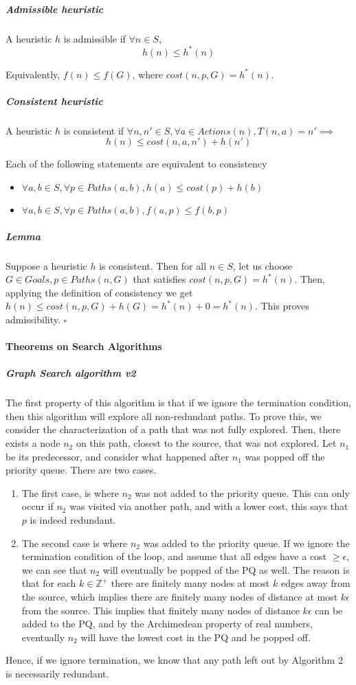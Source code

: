 \documentclass[a4paper]{article}
\begin{document}
\subparagraph{Admissible heuristic} A heuristic $h$ is admissible if $\forall n\in S$,
\begin{equation}
    h(n)\leq h^*(n)
\end{equation}

Equivalently, $f(n)\leq f(G)$, where $cost(n, p, G) = h^*(n)$.

\subparagraph{Consistent heuristic} A heuristic $h$ is consistent if $\forall n, n'\in S, \forall a\in Actions(n), T(n, a) = n'\implies$ 
\begin{equation}
    h(n)\leq cost(n, a, n') + h(n')
\end{equation}

Each of the following statements are equivalent to consistency
\begin{itemize}
    \item $\forall a, b\in S, \forall p\in Paths(a, b), h(a)\leq cost(p) + h(b)$
    \item $\forall a, b\in S, \forall p\in Paths(a, b), f(a, p)\leq f(b, p)$
\end{itemize}

\subparagraph{Lemma} Suppose a heuristic $h$ is consistent. Then for all $n\in S$, let us choose $G\in Goals, p\in Paths(n, G)$ that satisfies $cost(n, p, G) = h^*(n)$. Then, applying the definition of consistency we get $h(n)\leq cost(n, p, G) + h(G) = h^*(n) + 0 = h^*(n)$. This proves admissibility. $\square$

\paragraph{Theorems on Search Algorithms}
\subparagraph{Graph Search algorithm v2} The first property of this algorithm is that if we ignore the termination condition, then this algorithm will explore all non-redundant paths. To prove this, we consider the characterization of a path that was not fully explored. Then, there exists a node $n_2$ on this path, closest to the source, that was not explored. Let $n_1$ be its predecessor, and consider what happened after $n_1$ was popped off the priority queue. There are two cases.
\begin{enumerate}
    \item The first case, is where $n_2$ was not added to the priority queue. This can only occur if $n_2$ was visited via another path, and with a lower cost, this says that $p$ is indeed redundant.
    \item The second case is where $n_2$ was added to the priority queue. If we ignore the termination condition of the loop, and assume that all edges have a cost $\geq \epsilon$, we can see that $n_2$ will eventually be popped of the PQ as well. The reason is that for each $k\in \mathbb{Z}^+$ there are finitely many nodes at most $k$ edges away from the source, which implies there are finitely many nodes of distance at most $k\epsilon$ from the source. This implies that finitely many nodes of distance $k\epsilon$ can be added to the PQ, and by the Archimedean property of real numbers, eventually $n_2$ will have the lowest cost in the PQ and be popped off.
\end{enumerate}
Hence, if we ignore termination, we know that any path left out by Algorithm 2 is necessarily redundant.
\end{document}

